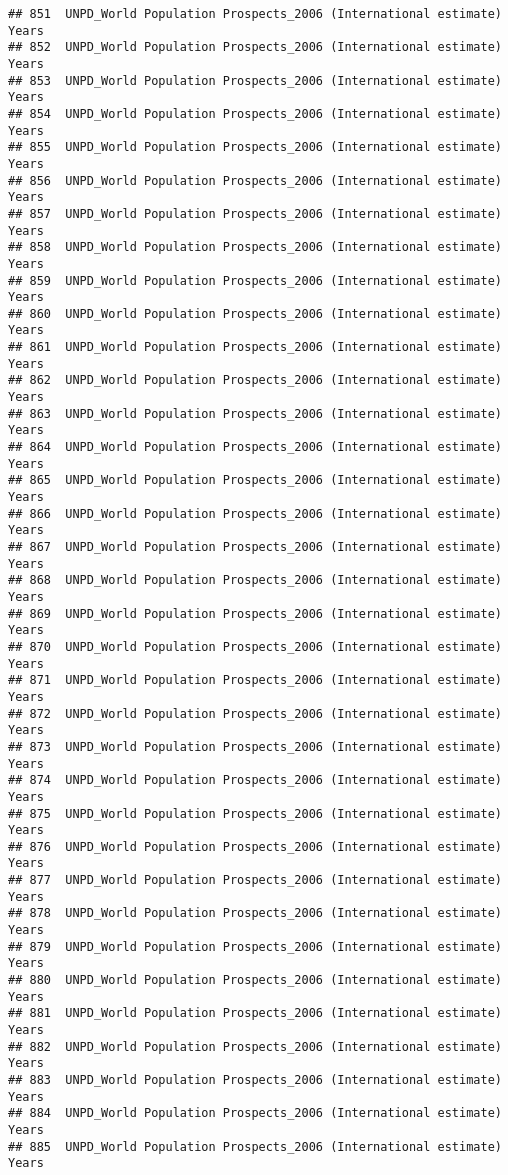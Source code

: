 \documentclass[]{article}
\begin{document}
\begin{verbatim}
## 851  UNPD_World Population Prospects_2006 (International estimate) Years
## 852  UNPD_World Population Prospects_2006 (International estimate) Years
## 853  UNPD_World Population Prospects_2006 (International estimate) Years
## 854  UNPD_World Population Prospects_2006 (International estimate) Years
## 855  UNPD_World Population Prospects_2006 (International estimate) Years
## 856  UNPD_World Population Prospects_2006 (International estimate) Years
## 857  UNPD_World Population Prospects_2006 (International estimate) Years
## 858  UNPD_World Population Prospects_2006 (International estimate) Years
## 859  UNPD_World Population Prospects_2006 (International estimate) Years
## 860  UNPD_World Population Prospects_2006 (International estimate) Years
## 861  UNPD_World Population Prospects_2006 (International estimate) Years
## 862  UNPD_World Population Prospects_2006 (International estimate) Years
## 863  UNPD_World Population Prospects_2006 (International estimate) Years
## 864  UNPD_World Population Prospects_2006 (International estimate) Years
## 865  UNPD_World Population Prospects_2006 (International estimate) Years
## 866  UNPD_World Population Prospects_2006 (International estimate) Years
## 867  UNPD_World Population Prospects_2006 (International estimate) Years
## 868  UNPD_World Population Prospects_2006 (International estimate) Years
## 869  UNPD_World Population Prospects_2006 (International estimate) Years
## 870  UNPD_World Population Prospects_2006 (International estimate) Years
## 871  UNPD_World Population Prospects_2006 (International estimate) Years
## 872  UNPD_World Population Prospects_2006 (International estimate) Years
## 873  UNPD_World Population Prospects_2006 (International estimate) Years
## 874  UNPD_World Population Prospects_2006 (International estimate) Years
## 875  UNPD_World Population Prospects_2006 (International estimate) Years
## 876  UNPD_World Population Prospects_2006 (International estimate) Years
## 877  UNPD_World Population Prospects_2006 (International estimate) Years
## 878  UNPD_World Population Prospects_2006 (International estimate) Years
## 879  UNPD_World Population Prospects_2006 (International estimate) Years
## 880  UNPD_World Population Prospects_2006 (International estimate) Years
## 881  UNPD_World Population Prospects_2006 (International estimate) Years
## 882  UNPD_World Population Prospects_2006 (International estimate) Years
## 883  UNPD_World Population Prospects_2006 (International estimate) Years
## 884  UNPD_World Population Prospects_2006 (International estimate) Years
## 885  UNPD_World Population Prospects_2006 (International estimate) Years

\end{verbatim}
\end{document}
